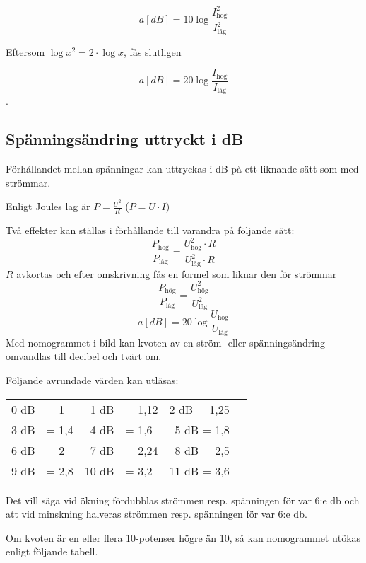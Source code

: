 \[a[dB] = 10\log \dfrac{I_{\text{hög}}^2}{I_{\text{låg}}^2}\]

Eftersom \(\log x^2 = 2 \cdot \log x\), fås slutligen

\[a[dB] = 20\log \dfrac{I_{\text{hög}}}{I_{\text{låg}}}\].

\subsection{Spänningsändring uttryckt i dB}

Förhållandet mellan spänningar kan uttryckas i dB på ett liknande sätt som med
strömmar.

Enligt Joules lag är \(P = \frac{U^2}{R}\) (\(P = U \cdot I\))

Två effekter kan ställas i förhållande till varandra på följande sätt:
\[\dfrac{P_{\text{hög}}}{P_{\text{låg}}}=\dfrac{U_{\text{hög}}^2 \cdot R}{U_{\text{låg}}^2 \cdot R}\]
\(R\) avkortas och efter omskrivning fås en formel som liknar den för strömmar
\[\dfrac{P_{\text{hög}}}{P_{\text{låg}}} = \dfrac{U_{\text{hög}}^2}{U_{\text{låg}}^2}\]
\[a[dB] = 20\log \dfrac{U_{\text{hög}}}{U_{\text{låg}}}\]
Med nomogrammet i bild  kan kvoten av en
ström- eller spänningsändring omvandlas till decibel och tvärt om.


Följande avrundade värden kan utläsas:

\begin{center}
\begin{tabular}{rlrlrl}
0 dB & = 1   &  1 dB & = 1,12 &  2 dB = 1,25 \\
3 dB & = 1,4 &  4 dB & = 1,6  &  5 dB = 1,8 \\
6 dB & = 2   &  7 dB & = 2,24 &  8 dB = 2,5 \\
9 dB & = 2,8 & 10 dB & = 3,2  & 11 dB = 3,6
\end{tabular}
\end{center}

Det vill säga vid ökning fördubblas strömmen resp. spänningen för var 6:e
\unit{\decibel} och att vid minskning halveras strömmen resp. spänningen för var
6:e \unit{\decibel}.

Om kvoten är en eller flera 10-potenser högre än 10, så kan nomogrammet utökas
enligt följande tabell.

